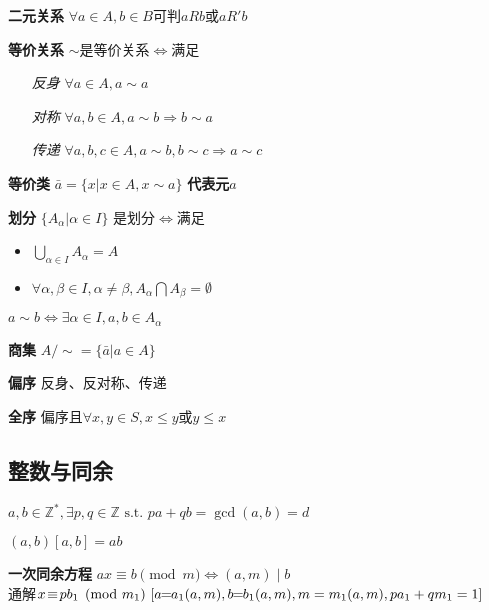 \documentclass[b4paper, 10pt]{ctexart}
\newcommand*{\setZ}{\mathbb{Z}}
\newcommand*{\st}{\text{ s.t. }}
\newcommand*{\impl}{\Rightarrow}
\renewcommand*{\iff}{\Leftrightarrow}
\renewcommand*{\leq}{\leqslant}
\begin{document}
\begin{multicols}{3}
    \textbf{二元关系} $\forall a \!\in\! A, b \!\in\! B$可判$\!aRb\!$或$\!aR'b\!$

    \textbf{等价关系} $\sim$是等价关系$\iff$满足

    \begin{itemize}
        \item[\emph{反身}] $\forall a \!\in\! A, a \sim a$
        \item[\emph{对称}] $\forall a, b \!\in\! A, a \sim b \impl b \sim a$
        \item[\emph{传递}] $\forall a, b, c \!\in\! A, a \sim b, b \sim c \impl a \sim c $
    \end{itemize}

    \textbf{等价类} $\bar{a} = \{ x | x \in A, x \sim a \}$ \textbf{代表元}$a$

    \textbf{划分} $\{ A_\alpha | \alpha \in I \}$ 是划分$\iff$满足

    \begin{itemize}
        \item $\bigcup\limits_{\alpha \in I} A_\alpha = A$
        \item $\forall \alpha, \beta \in I, \alpha \ne \beta, A_\alpha \bigcap A_\beta = \emptyset$
    \end{itemize}

    \begin{theorem}[等价与划分]
        $a \sim b \iff \exists \alpha \in I, a, b \in A_\alpha$
    \end{theorem}

    \textbf{商集} $A/\sim = \{ \bar{a} | a \in A \}$

    \textbf{偏序} 反身、反对称、传递

    \textbf{全序} 偏序且$\forall x, y \in S, x \leq y$或$y \leq x$

    \subsection{整数与同余}

    \begin{theorem}[Bézout定理]
        $a, b \in \setZ^*, \exists p, q \in \setZ \st pa + qb = \gcd(a, b) = d$ \quad[辗转相除求p, q]
    \end{theorem}

    \begin{theorem}
        $(a, b)[a, b] = ab$
    \end{theorem}

    \textbf{一次同余方程} $ax \!\equiv\! b \pmod{m} \iff (a, m) \!\mid\! b$\\
    通解$x \!\equiv\! pb_1 \pmod{m_1}\ [a \!\! = \!\! a_1(a, m), b \!\! = \!\! b_1(a, m), \\ m = m_1(a, m), pa_1 +qm_1 = 1]$


\end{multicols}
\end{document}
